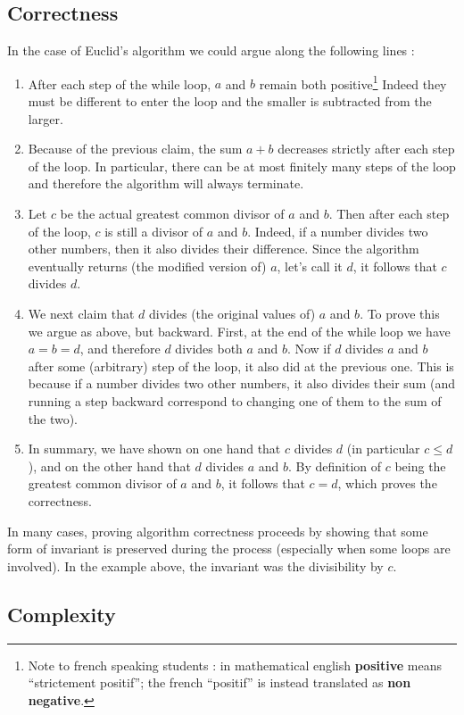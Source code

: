 \documentclass[12pt]{article}
\theoremstyle{plain}
\theoremstyle{remark}
\begin{document}
\subsection*{Correctness}
In the case of Euclid's algorithm we could argue along
the following lines :
\begin{enumerate}
\item After each step of the while loop, $a$ and $b$ remain both
	positive\footnote{Note to french speaking students : in mathematical english
		{\bf positive} means ``strictement positif''; the french ``positif''
		is instead translated as {\bf non negative}.}
Indeed they must be different to enter the loop and the smaller is subtracted
from the larger. 
\item Because of the previous claim, the sum $a + b$ decreases strictly after
each step of the loop. In particular, there can be at most finitely many steps
of the loop and therefore the algorithm will always terminate.
\item Let $c$ be the actual greatest common divisor of $a$ and $b$. Then after
each step of the loop, $c$ is still a divisor of $a$ and $b$. Indeed, if a
number divides two other numbers, then it also divides their difference. Since
the algorithm eventually returns (the modified version of) $a$, let's call it
$d$, it follows that $c$ divides $d$.
\item We next claim that $d$ divides (the original values of) $a$ and $b$. To
prove this we argue as above, but backward. First, at the end of the while loop
we have $a = b = d$, and therefore $d$ divides both $a$ and $b$. Now if $d$
divides $a$ and $b$ after some (arbitrary) step of the loop, it also did at the
previous one. This is because if a number divides two other numbers, it also
divides their sum (and running a step backward correspond to changing one of
them to the sum of the two). 
\item In summary, we have shown on one hand that $c$ divides $d$ (in particular
$c \leq d$), and on the other hand that $d$ divides $a$
and $b$. By definition of $c$ being the greatest common divisor of $a$ and $b$,
it follows that $c = d$, which proves the correctness.
\end{enumerate} 

In many cases, proving algorithm correctness proceeds by showing that some form
of invariant is preserved during the process (especially when some loops are
involved). In the example above, the invariant was the divisibility by $c$.

\subsection*{Complexity}
\end{document}
